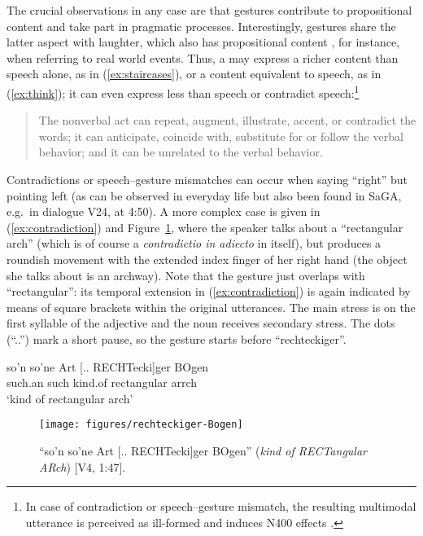 \documentclass[output=paper
 	        ,biblatex
                ,babelshorthands
                ,newtxmath
                ,draftmode
                ,colorlinks, citecolor=brown
]{langscibook}
\begin{document}
The crucial observations in any case are that gestures contribute to propositional content and take part in pragmatic processes.
%
Interestingly, gestures share the latter aspect with laughter, which also has propositional content \citep{Ginzburg:Breitholz:Cooper:Hough:Tian:2015}, for instance, when referring to real world events.
%
Thus, a  may express a richer content than speech alone, as in (\ref{ex:staircases}), or a content equivalent to speech, as in (\ref{ex:think}); it can even express less than speech or contradict speech:\footnote{In case of contradiction or speech--gesture mismatch, the resulting multimodal utterance is perceived as ill-formed and induces N400 effects \citep{Wu:Coulson:2005,Kelly:Kravitz:Hopkins:2004}.}
%
\begin{quote}
The nonverbal act can repeat, augment, illustrate, accent, or contradict the words; it can anticipate, coincide with, substitute for or follow the verbal behavior; and it can be unrelated to the verbal behavior.\hfill 
\citep[53]{Ekman:Friesen:1969}
\end{quote}

Contradictions or speech--gesture mismatches can occur when saying \enquote{right} but pointing left (as can be observed in everyday life but also been found in SaGA, e.g.\ in dialogue V24, at 4:50).
%
A more complex case is given in (\ref{ex:contradiction}) and Figure~\ref{fig:contradiction}, where the speaker talks about a \enquote{rectangular arch} (which is of course a \textit{contradictio in adiecto} in itself), but produces a roundish movement with the extended index finger of her right hand (the object she talks about is an archway).
%
Note that the gesture just overlaps with \enquote{rectangular}: its temporal extension in (\ref{ex:contradiction}) is again indicated by means of square brackets within the original  utterances. 
%
The main stress is on the first syllable of the adjective and the noun receives secondary stress.
%
The dots (\enquote{..}) mark a short pause, so the gesture starts before \enquote{rechteckiger}.

\ea \label{ex:contradiction}
\gll 
 so'n so'ne Art {[.. RECHTecki]ger} BOgen \\
such.an such kind.of rectangular arrch \\
\glt 
\enquote*{kind of rectangular arch}
\z

\begin{figure}
  \centering
  \texttt{[image: figures/rechteckiger-Bogen]}
  \caption[Rectangular arch]{\enquote{so'n so'ne Art [.. RECHTecki]ger BOgen} (\textit{kind of RECTangular ARch}) [V4, 1:47].}
  \label{fig:contradiction}
\end{figure}
\end{document}
